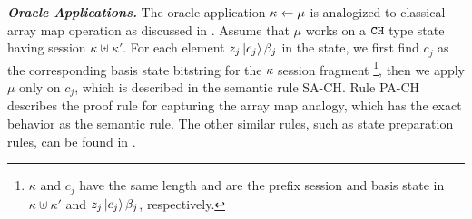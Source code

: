 \noindent\textbf{\textit{Oracle Applications.}}\label{sec:oracle-state}
The oracle application ${\kappa} \xleftarrow{} {\mu}$ is analogized to classical array map operation as discussed in . Assume that $\mu$ works on a $\texttt{CH}$ type state having session $\kappa\uplus \kappa'$. For each element $z_j\left\vert{c_{j}}\right\rangle{\beta_j}$ in the state, we first find $c_{j}$ as the corresponding basis state bitstring for the $\kappa$ session fragment \footnote{ $\kappa$ and $c_{j}$ have the same length and are the prefix session and basis state in $\kappa\uplus \kappa'$ and $z_j\left\vert{c_{j}}\right\rangle{\beta_j}$, respectively.}, then we apply $\mu$ only on $c_{j}$, which is described in the semantic rule \textsc{SA-CH}. Rule \textsc{PA-CH} describes the proof rule for capturing the array map analogy, which has the exact behavior as the semantic rule.
The other similar rules, such as state preparation rules, can be found in . 

